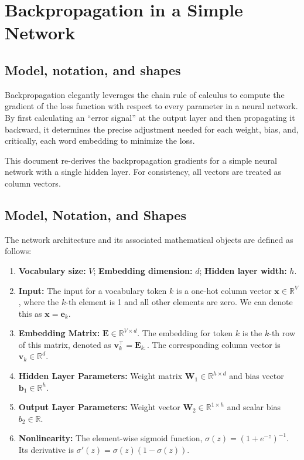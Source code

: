 \documentclass[%
  reprint,
  superscriptaddress,
  showpacs,
  showkeys,
  amsmath,amssymb,
  pra,
  longbibliography,
  floatfix,
  x11names
]{revtex4-2}
\begin{document}
\section{Backpropagation in a Simple Network}
\label{app:backp}

\subsection{Model, notation, and shapes}

Backpropagation elegantly leverages the chain rule of calculus to compute the gradient of the loss function with respect to every parameter in a neural network. By first calculating an ``error signal'' at the output layer and then propagating it backward, it determines the precise adjustment needed for each weight, bias, and, critically, each word embedding to minimize the loss.

This document re-derives the backpropagation gradients for a simple neural network with a single hidden layer. For consistency, all vectors are treated as column vectors.

\subsection{Model, Notation, and Shapes}
The network architecture and its associated mathematical objects are defined as follows:
\begin{enumerate}
    \item \textbf{Vocabulary size:} $V$; \textbf{Embedding dimension:} $d$; \textbf{Hidden layer width:} $h$.
    \item \textbf{Input:} The input for a vocabulary token $k$ is a one-hot column vector $\bm{x} \in \mathbb{R}^V$, where the $k$-th element is 1 and all other elements are zero. We can denote this as $\bm{x} = \bm{e}_k$.
    \item \textbf{Embedding Matrix:} $\bm{E} \in \mathbb{R}^{V \times d}$. The embedding for token $k$ is the $k$-th row of this matrix, denoted as $\bm{v}_k^\intercal = \bm{E}_{k:}$. The corresponding column vector is $\bm{v}_k \in \mathbb{R}^d$.
    \item \textbf{Hidden Layer Parameters:} Weight matrix $\bm{W}_1 \in \mathbb{R}^{h \times d}$ and bias vector $\bm{b}_1 \in \mathbb{R}^h$.
    \item \textbf{Output Layer Parameters:} Weight vector $\bm{W}_2 \in \mathbb{R}^{1 \times h}$ and scalar bias $b_2 \in \mathbb{R}$.
    \item \textbf{Nonlinearity:} The element-wise sigmoid function, $\sigma(z) = (1+e^{-z})^{-1}$. Its derivative is $\sigma'(z) = \sigma(z)(1-\sigma(z))$.
\end{enumerate}
\end{document}
